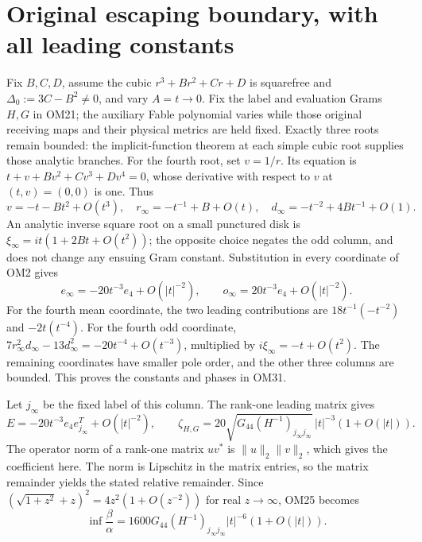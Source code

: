 \section{Original escaping boundary, with all leading constants}
Fix $B,C,D$, assume the cubic $r^3+Br^2+Cr+D$ is squarefree
and $\Delta_0:=3C-B^2\ne0$, and vary $A=t\to0$.
Fix the label and evaluation Grams $H,G$ in OM21; the auxiliary
Fable polynomial varies while those original receiving maps
and their physical metrics are held fixed.
Exactly three roots remain bounded: the implicit-function theorem
at each simple cubic root supplies those analytic branches.
For the fourth root, set $v=1/r$.  Its equation is
$t+v+Bv^2+Cv^3+Dv^4=0$, whose derivative with respect to $v$
at $(t,v)=(0,0)$ is one.  Thus
\[
v=-t-Bt^2+O(t^3),\quad
r_\infty=-t^{-1}+B+O(t),\quad
d_\infty=-t^{-2}+4Bt^{-1}+O(1).
\tag{OM30}
\]
An analytic inverse square root on a small punctured disk is
$\xi_\infty=it(1+2Bt+O(t^2))$; the opposite choice negates
the odd column, and does not change any ensuing Gram constant.
Substitution in every coordinate of OM2 gives
\[
e_\infty=-20t^{-3}e_4+O(|t|^{-2}),\qquad
o_\infty=20t^{-3}e_4+O(|t|^{-2}).
\tag{OM31}
\]
For the fourth mean coordinate, the two leading contributions
are $18t^{-1}(-t^{-2})$ and $-2t(t^{-4})$.
For the fourth odd coordinate, $7r_\infty^2d_\infty-
13d_\infty^2=-20t^{-4}+O(t^{-3})$, multiplied by
$i\xi_\infty=-t+O(t^2)$.  The remaining coordinates have
smaller pole order, and the other three columns are bounded.
This proves the constants and phases in OM31.

Let $j_\infty$ be the fixed label of this column.
The rank-one leading matrix gives
\[
E=-20t^{-3}e_4e_{j_\infty}^T+O(|t|^{-2}),\qquad
\zeta_{H,G}
=20\sqrt{G_{44}(H^{-1})_{j_\infty j_\infty}}\,
 |t|^{-3}(1+O(|t|)).
\tag{OM32}
\]
The operator norm of a rank-one matrix $uv^*$ is
$\|u\|_2\|v\|_2$, which gives the coefficient here.
The norm is Lipschitz in the matrix entries, so the matrix
remainder yields the stated relative remainder.  Since
$(\sqrt{1+z^2}+z)^2=4z^2(1+O(z^{-2}))$ for real $z\to\infty$,
OM25 becomes
\[
\boxed{\inf\frac{\beta}{\alpha}
=1600G_{44}(H^{-1})_{j_\infty j_\infty}
 |t|^{-6}(1+O(|t|)).}
\tag{OM33}
\]

